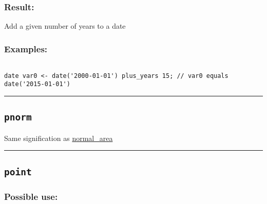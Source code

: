 \documentclass[]{book}
\theoremstyle{definition}
\theoremstyle{definition}
\theoremstyle{definition}
\theoremstyle{remark}
\begin{document}
\subsubsection{Result:}\label{result-393}

Add a given number of years to a date

\subsubsection{Examples:}\label{examples-282}

\begin{verbatim}
 
date var0 <- date('2000-01-01') plus_years 15; // var0 equals date('2015-01-01')
\end{verbatim}

\begin{center}\rule{0.5\linewidth}{\linethickness}\end{center}

\subsection{\texorpdfstring{\texttt{pnorm}}{pnorm}}\label{pnorm}

Same signification as \href{OperatorsNR\#normal_area}{normal\_area}

\begin{center}\rule{0.5\linewidth}{\linethickness}\end{center}

\subsection{\texorpdfstring{\texttt{point}}{point}}\label{point}

\subsubsection{Possible use:}\label{possible-use-408}
\end{document}
